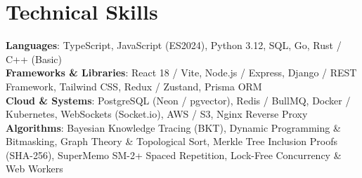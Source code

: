 \documentclass[letterpaper,10pt]{article}
\begin{document}
\section{Technical Skills}
\begin{itemize}[leftmargin=0.15in, label={}]
  \small{\item{
    \textbf{Languages}{: TypeScript, JavaScript (ES2024), Python 3.12, SQL, Go, Rust / C++ (Basic)} \\
    \textbf{Frameworks \& Libraries}{: React 18 / Vite, Node.js / Express, Django / REST Framework, Tailwind CSS, Redux / Zustand, Prisma ORM} \\
    \textbf{Cloud \& Systems}{: PostgreSQL (Neon / pgvector), Redis / BullMQ, Docker / Kubernetes, WebSockets (Socket.io), AWS / S3, Nginx Reverse Proxy} \\
    \textbf{Algorithms}{: Bayesian Knowledge Tracing (BKT), Dynamic Programming \& Bitmasking, Graph Theory \& Topological Sort, Merkle Tree Inclusion Proofs (SHA-256), SuperMemo SM-2+ Spaced Repetition, Lock-Free Concurrency \& Web Workers}
  }}
\end{itemize}

\end{document}
